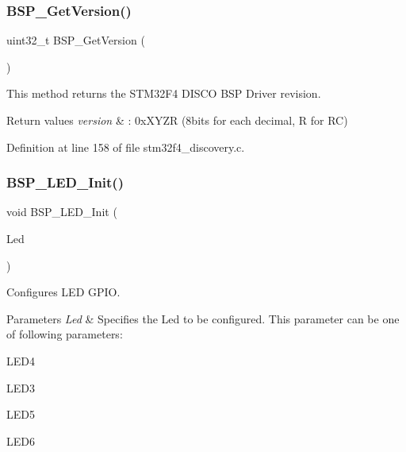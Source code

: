 \subsubsection{\texorpdfstring{B\+S\+P\+\_\+\+Get\+Version()}{BSP\_GetVersion()}}
{\footnotesize\ttfamily uint32\+\_\+t B\+S\+P\+\_\+\+Get\+Version (\begin{DoxyParamCaption}\item[{void}]{ }\end{DoxyParamCaption})}



This method returns the S\+T\+M32\+F4 D\+I\+S\+CO B\+SP Driver revision. 


\begin{DoxyRetVals}{Return values}
{\em version} & \+: 0x\+X\+Y\+ZR (8bits for each decimal, R for RC) \\
\hline
\end{DoxyRetVals}


Definition at line 158 of file stm32f4\+\_\+discovery.\+c.

\mbox{\label{group___s_t_m32_f4___d_i_s_c_o_v_e_r_y___l_o_w___l_e_v_e_l___exported___functions_gab58a4f16a476a53653c5c400e3bed158}} 
\subsubsection{\texorpdfstring{B\+S\+P\+\_\+\+L\+E\+D\+\_\+\+Init()}{BSP\_LED\_Init()}}
{\footnotesize\ttfamily void B\+S\+P\+\_\+\+L\+E\+D\+\_\+\+Init (\begin{DoxyParamCaption}\item[{Led\+\_\+\+Type\+Def}]{Led }\end{DoxyParamCaption})}



Configures L\+ED G\+P\+IO. 


\begin{DoxyParams}{Parameters}
{\em Led} & Specifies the Led to be configured. This parameter can be one of following parameters\+: \begin{DoxyItemize}
\item L\+E\+D4 \item L\+E\+D3 \item L\+E\+D5 \item L\+E\+D6 \end{DoxyItemize}
\\
\hline
\end{DoxyParams}


